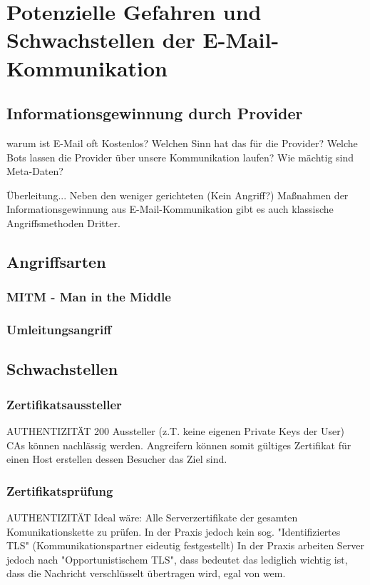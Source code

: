 \chapter{Potenzielle Gefahren und Schwachstellen der E-Mail-Kommunikation}
\label{chap:gefahren}
\section{Informationsgewinnung durch Provider}
warum ist E-Mail oft Kostenlos?
Welchen Sinn hat das für die Provider?
Welche Bots lassen die Provider über unsere Kommunikation laufen?
Wie mächtig sind Meta-Daten?


Überleitung... Neben den weniger gerichteten (Kein Angriff?) Maßnahmen der Informationsgewinnung aus E-Mail-Kommunikation gibt es auch klassische Angriffsmethoden Dritter.

\section{Angriffsarten}
\subsection{MITM - Man in the Middle}
\label{sec:mitm}
\subsection{Umleitungsangriff}


\section{Schwachstellen}
\subsection{Zertifikatsaussteller}
\label{sec:zertifikatsaussteller}
AUTHENTIZITÄT 
200 Aussteller (z.T. keine eigenen Private Keys der User) CAs können nachlässig werden. Angreifern können somit gültiges Zertifikat für einen Host erstellen dessen Besucher das Ziel sind.
\subsection{Zertifikatsprüfung}
\label{sec:zertifikatspruefung}
AUTHENTIZITÄT
Ideal wäre: Alle Serverzertifikate der gesamten Komunikationskette zu prüfen. In der Praxis jedoch kein sog. "Identifiziertes TLS" (Kommunikationspartner eideutig festgestellt) In der Praxis arbeiten Server jedoch nach "Opportunistischem TLS", dass bedeutet das lediglich wichtig ist, dass die Nachricht verschlüsselt übertragen wird, egal von wem.

